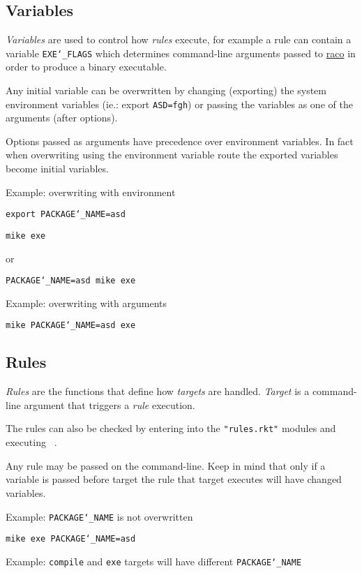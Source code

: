 \documentclass{article}
\newcommand{\Scribtexttt}[1]{{\texttt{#1}}}
\let\SOriginalthesubsubsection\thesubsubsection
\newcommand{\Ssubsection}[2]{\subsection[#1]{#2}\let\thesubsubsection\SOriginalthesubsubsection}
\newcommand{\SColorize}[2]{\color{#1}{#2}}
\newcommand{\SHyphen}[1]{#1}
\newcommand{\inColor}[2]{{\SHyphen{\Scribtexttt{\SColorize{#1}{#2}}}}}
\newcommand{\RktPn}[1]{\inColor{ParenColor}{#1}}
\newcommand{\RktSym}[1]{\inColor{IdentifierColor}{#1}}
\begin{document}
\Ssubsection{Variables}{Variables}\label{t:x28part_x22Variablesx22x29}

\textit{Variables} are used to control how \textit{rules} execute,
for example a rule can contain
a variable \Scribtexttt{EXE{\char`\_}FLAGS} which determines command{-}line arguments
passed to
\href{https://docs.racket-lang.org/raco/exe.html?q=raco\%20exe}{raco}
in order to produce a binary executable.

Any initial variable can be overwritten by changing (exporting)
the system environment variables (ie.: export \Scribtexttt{ASD=fgh})
or passing the variables as one of the arguments (after options).

Options passed as arguments have precedence over environment variables.
In fact when overwriting using the environment variable route
the exported variables become initial variables.

Example: overwriting with environment

\mbox{\hphantom{\Scribtexttt{xx}}}\Scribtexttt{export PACKAGE{\char`\_}NAME=asd}

\noindent \mbox{\hphantom{\Scribtexttt{xx}}}\Scribtexttt{mike exe}

or

\mbox{\hphantom{\Scribtexttt{xx}}}\Scribtexttt{PACKAGE{\char`\_}NAME=asd mike exe}

Example: overwriting with arguments

\mbox{\hphantom{\Scribtexttt{xx}}}\Scribtexttt{mike PACKAGE{\char`\_}NAME=asd exe}

\Ssubsection{Rules}{Rules}\label{t:x28part_x22Rulesx22x29}

\textit{Rules} are the functions that define how \textit{targets} are handled.
\textit{Target} is a command{-}line argument that triggers
a \textit{rule} execution.

The rules can also be checked by entering into the \Scribtexttt{"rules{\hbox{\texttt{.}}}rkt"} modules
and executing \RktPn{(}\RktSym{hash{-}keys}\Scribtexttt{ }\RktSym{rules}\RktPn{)}.

Any rule may be passed on the command{-}line.
Keep in mind that only if a variable is passed before target
the rule that target executes will have changed variables.

Example: \Scribtexttt{PACKAGE{\char`\_}NAME} is not overwritten

\mbox{\hphantom{\Scribtexttt{xx}}}\Scribtexttt{mike exe PACKAGE{\char`\_}NAME=asd}

Example: \Scribtexttt{compile} and \Scribtexttt{exe} targets
will have different \Scribtexttt{PACKAGE{\char`\_}NAME}
\end{document}
